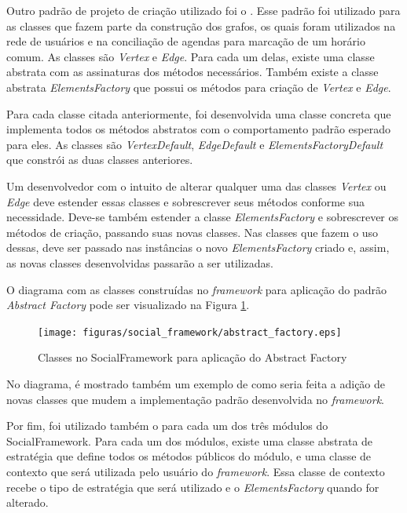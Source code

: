 Outro padrão de projeto de criação utilizado foi o . Esse padrão foi utilizado para as classes que fazem parte da construção dos grafos, os quais foram utilizados na rede de usuários e na conciliação de agendas para marcação de um horário comum. As classes são \textit{Vertex} e \textit{Edge}. Para cada um delas, existe uma classe abstrata com as assinaturas dos métodos necessários. Também existe a classe abstrata \textit{ElementsFactory} que possui os métodos para criação de \textit{Vertex} e \textit{Edge}.

Para cada classe citada anteriormente, foi desenvolvida uma classe concreta que implementa todos os métodos abstratos com o comportamento padrão esperado para eles. As classes são \textit{VertexDefault}, \textit{EdgeDefault} e \textit{ElementsFactoryDefault} que constrói as duas classes anteriores.

Um desenvolvedor com o intuito de alterar qualquer uma das classes \textit{Vertex} ou \textit{Edge} deve estender essas classes e sobrescrever seus métodos conforme sua necessidade. Deve-se também estender a classe \textit{ElementsFactory} e sobrescrever os métodos de criação, passando suas novas classes. Nas classes que fazem o uso dessas, deve ser passado nas instâncias o novo \textit{ElementsFactory} criado e, assim, as novas classes desenvolvidas passarão a ser utilizadas.

O diagrama com as classes construídas no \textit{framework} para aplicação do padrão \textit{Abstract Factory} pode ser visualizado na Figura \ref{padrao_abstract_factory}.

\newpage
\begin{figure}[h]
    \centering
    \texttt{[image: figuras/social\_framework/abstract\_factory.eps]}
    \caption{Classes no SocialFramework para aplicação do Abstract Factory}
    \label{padrao_abstract_factory}
\end{figure}

No diagrama, é mostrado também um exemplo de como seria feita a adição de novas classes que mudem a implementação padrão desenvolvida no \textit{framework}.

Por fim, foi utilizado também o  para cada um dos três módulos do SocialFramework. Para cada um dos módulos, existe uma classe abstrata de estratégia que define todos os métodos públicos do módulo, e uma classe de contexto que será utilizada pelo usuário do \textit{framework}. Essa classe de contexto recebe o tipo de estratégia que será utilizado e o \textit{ElementsFactory} quando for alterado.

